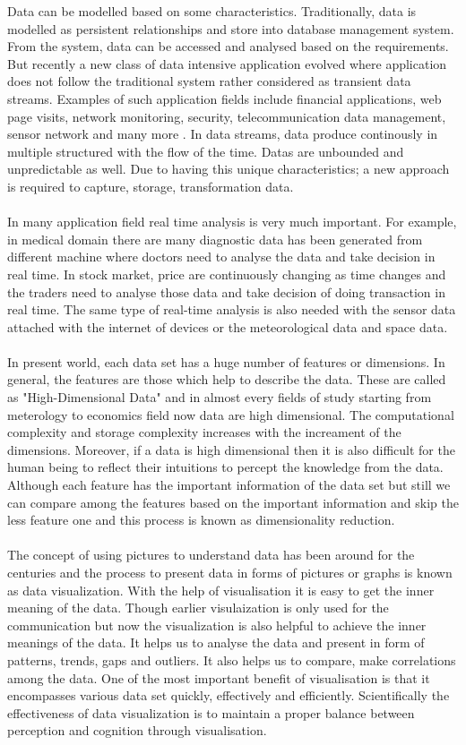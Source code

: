 Data can be modelled based on some characteristics. Traditionally, data is modelled as persistent relationships and store into database management system. From the system, data can be accessed and analysed based on the requirements. But recently a new class of data intensive application evolved where application does not follow the traditional system rather considered as transient data streams. Examples of such application fields include financial applications, web page visits, network monitoring, security, telecommunication data management, sensor network  and many more \cite{p306}. In data streams, data produce continously in multiple structured with the flow of the time. Datas are unbounded and unpredictable as well. Due to having this unique characteristics; a new approach is required to capture, storage, transformation data.\\\\
In many application field real time analysis is very much important. For example, in medical domain there are many diagnostic data has been generated from different machine where doctors need to analyse the data and take decision in real time. In stock market, price are continuously changing as time changes and the traders need to analyse those data and take decision of doing transaction in real time. The same type of real-time analysis is also needed  with the sensor data attached with the internet of devices or the meteorological data and space data.\\\\
In present world, each data set has a huge number of features or dimensions. In general, the features are those which help to describe the data. These are called as "High-Dimensional Data" and in almost every fields of study starting from meterology to economics field now data are high dimensional. The computational complexity and storage complexity increases with the increament of the dimensions. Moreover, if a data is high dimensional then it is also difficult for the human being to reflect their intuitions to percept the knowledge from the data. Although each feature has the important information of the data set but still we can compare among the features based on the important information and skip the less feature one and this process is known as dimensionality reduction.\\\\
The concept of using pictures to understand data has been around for the centuries and the process to present data in forms of pictures or graphs is known as data visualization. With the help of visualisation it is easy to get the inner meaning of the data. Though earlier visulaization is only used for the communication but now the visualization is also helpful to achieve the inner meanings of the data. It helps us to analyse the data and present in form of patterns, trends, gaps and outliers. It also helps us to compare, make correlations among the data. One of the most important benefit of visualisation is that it encompasses various data set quickly, effectively and efficiently. Scientifically the effectiveness of data visualization is to maintain a proper balance between perception and cognition through visualisation.\\\\

